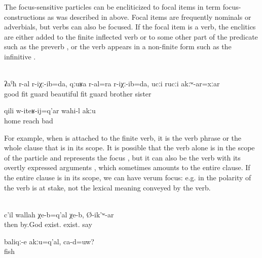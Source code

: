 The focus-sensitive particles can be encliticized to focal items in term focus-constructions as was described in  above. Focal items are frequently nominals or adverbials, but verbs can also be focused. If the focal item is a verb, the enclitics are either added to the finite inflected verb or to some other part of the predicate such as the preverb , or the verb appears in a non-finite form such as the infinitive .
%
\begin{exe}
	\\\label{ex:He guarded me well, he also guarded me safely, although without brothers and sisters}%
	\gll	ʡaˁħ	r-al	r-iχː-ib=da,	qːuʁa	r-al=ra	r-iχː-ib=da, ucːi	rucːi	akːʷ-ar=xːar\\
		good	\tsc{f-}fit	guard	beautiful	\tsc{f-}fit	guard brother	sister	\\
	\glt	{}

	\ex	\label{ex:‎Coming home is not bad}
	\gll	qili	w-iteʁ-ij=q'ar	wahi-l	akːu\\
		home	reach	bad	\\
	\glt	{}
\end{exe}

For example, when  is attached to the finite verb, it is the verb phrase or the whole clause that is in its scope. It is possible that the verb alone is in the scope of the particle and represents the focus , but it can also be the verb with its overtly expressed arguments , which sometimes amounts to the entire clause. If the entire clause is in its scope, we can have verum focus: e.g. in  the polarity of the verb is at stake, not the lexical meaning conveyed by the verb.
%
\begin{exe}
	\\\label{ex:Well, by God, we do have them, he said@17c}%
	\gll	c'il	wallah	χe-b=q'al	χe-b,	Ø-ik'ʷ-ar\\
		then	by.God	exist.	exist.	say\\
	\glt	{}

	\ex	\label{ex:These are NOT fish, right@8e}
	\gll	baliqː-e	akːu=q'al,	ca-d=uw?\\
		fish		\\
	\glt	{}
\end{exe}

